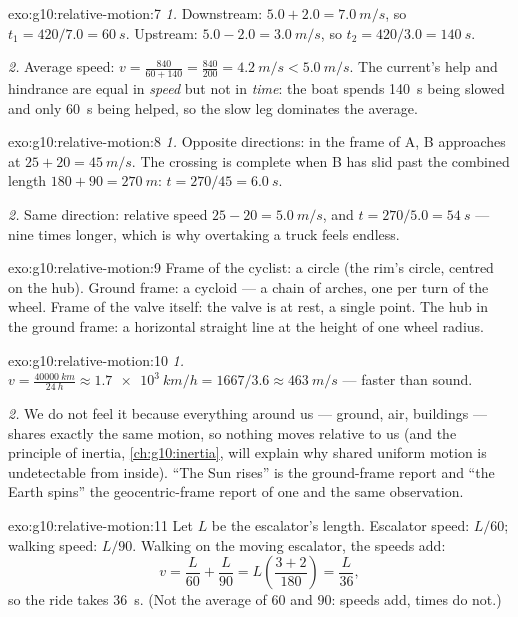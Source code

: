 \begin{solution}{exo:g10:relative-motion:7}
\emph{1.} Downstream: $5.0 + 2.0 = \qty{7.0}{m/s}$, so
$t_1 = 420/7.0 = \qty{60}{s}$. Upstream: $5.0 - 2.0 = \qty{3.0}{m/s}$,
so $t_2 = 420/3.0 = \qty{140}{s}$.

\emph{2.} Average speed: $v = \frac{840}{60 + 140}
= \frac{840}{200} = \qty{4.2}{m/s} < \qty{5.0}{m/s}$. The current's
help and hindrance are equal in \emph{speed} but not in \emph{time}:
the boat spends \qty{140}{s} being slowed and only \qty{60}{s} being
helped, so the slow leg dominates the average.
\end{solution}

\begin{solution}{exo:g10:relative-motion:8}
\emph{1.} Opposite directions: in the frame of A, B approaches at
$25 + 20 = \qty{45}{m/s}$. The crossing is complete when B has slid
past the combined length $180 + 90 = \qty{270}{m}$:
$t = 270/45 = \qty{6.0}{s}$.

\emph{2.} Same direction: relative speed $25 - 20 = \qty{5.0}{m/s}$,
and $t = 270/5.0 = \qty{54}{s}$ --- nine times longer, which is why
overtaking a truck feels endless.
\end{solution}

\begin{solution}{exo:g10:relative-motion:9}
Frame of the cyclist: a circle (the rim's circle, centred on the hub).
Ground frame: a cycloid --- a chain of arches, one per turn of the
wheel. Frame of the valve itself: the valve is at rest, a single point.
The hub in the ground frame: a horizontal straight line at the height
of one wheel radius.
\end{solution}

\begin{solution}{exo:g10:relative-motion:10}
\emph{1.} $v = \frac{\qty{40000}{km}}{\qty{24}{h}}
\approx \qty{1.7e3}{km/h} = 1667/3.6 \approx \qty{463}{m/s}$ ---
faster than sound.

\emph{2.} We do not feel it because everything around us --- ground,
air, buildings --- shares exactly the same motion, so nothing moves
relative to us (and the principle of inertia,
\cref{ch:g10:inertia}, will explain why shared uniform motion is
undetectable from inside). ``The Sun rises'' is the ground-frame
report and ``the Earth spins'' the geocentric-frame report of one and
the same observation.
\end{solution}

\begin{solution}{exo:g10:relative-motion:11}
Let $L$ be the escalator's length. Escalator speed: $L/60$; walking
speed: $L/90$. Walking on the moving escalator, the speeds add:
\[
v = \frac{L}{60} + \frac{L}{90} = L\left(\frac{3 + 2}{180}\right)
= \frac{L}{36},
\]
so the ride takes \qty{36}{s}. (Not the average of $60$ and $90$:
speeds add, times do not.)
\end{solution}


